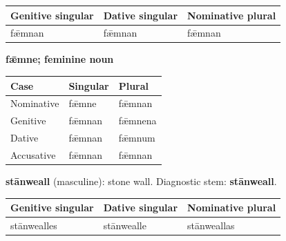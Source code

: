 \par\begingroup
\fontsize{10.5}{13.2}\selectfont
\setlength{\LTleft}{0pt}\setlength{\LTright}{\fill}
\noindent
\begin{tabular}{@{}>{\raggedright\arraybackslash}p{39.24mm}>{\raggedright\arraybackslash}p{36.31mm}>{\raggedright\arraybackslash}p{42.82mm}@{}}
\toprule
\textbf{Genitive singular} & \textbf{Dative singular} & \textbf{Nominative plural} \\
\midrule
fǣmnan & fǣmnan & fǣmnan \\
\bottomrule
\end{tabular}
\par\endgroup

\textbf{fǣmne; feminine noun}

\par\begingroup
\fontsize{10.5}{13.2}\selectfont
\setlength{\LTleft}{0pt}\setlength{\LTright}{\fill}
\noindent
\begin{tabular}{@{}>{\raggedright\arraybackslash}p{39.46mm}>{\raggedright\arraybackslash}p{39.46mm}>{\raggedright\arraybackslash}p{39.46mm}@{}}
\toprule
\textbf{Case} & \textbf{Singular} & \textbf{Plural} \\
\midrule
Nominative & fǣmne & fǣmnan \\
Genitive & fǣmnan & fǣmnena \\
Dative & fǣmnan & fǣmnum \\
Accusative & fǣmnan & fǣmnan \\
\bottomrule
\end{tabular}
\par\endgroup

\textbf{stānweall} (masculine): stone wall. Diagnostic stem: \textbf{stānweall}.

\par\begingroup
\fontsize{10.5}{13.2}\selectfont
\setlength{\LTleft}{0pt}\setlength{\LTright}{\fill}
\noindent
\begin{tabular}{@{}>{\raggedright\arraybackslash}p{40.9mm}>{\raggedright\arraybackslash}p{36.57mm}>{\raggedright\arraybackslash}p{40.9mm}@{}}
\toprule
\textbf{Genitive singular} & \textbf{Dative singular} & \textbf{Nominative plural} \\
\midrule
stānwealles & stānwealle & stānweallas \\
\bottomrule
\end{tabular}
\par\endgroup

